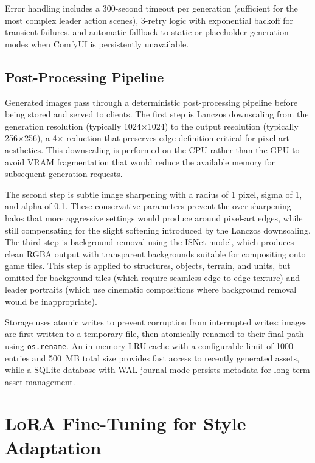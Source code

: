 \documentclass[conference]{IEEEtran}
\begin{document}
Error handling includes a 300-second timeout per generation (sufficient for the most complex leader action scenes), 3-retry logic with exponential backoff for transient failures, and automatic fallback to static or placeholder generation modes when ComfyUI is persistently unavailable.

\subsection{Post-Processing Pipeline}

Generated images pass through a deterministic post-processing pipeline before being stored and served to clients. The first step is Lanczos downscaling from the generation resolution (typically 1024$\times$1024) to the output resolution (typically 256$\times$256), a 4$\times$ reduction that preserves edge definition critical for pixel-art aesthetics. This downscaling is performed on the CPU rather than the GPU to avoid VRAM fragmentation that would reduce the available memory for subsequent generation requests.

The second step is subtle image sharpening with a radius of 1 pixel, sigma of 1, and alpha of 0.1. These conservative parameters prevent the over-sharpening halos that more aggressive settings would produce around pixel-art edges, while still compensating for the slight softening introduced by the Lanczos downscaling. The third step is background removal using the ISNet model, which produces clean RGBA output with transparent backgrounds suitable for compositing onto game tiles. This step is applied to structures, objects, terrain, and units, but omitted for background tiles (which require seamless edge-to-edge texture) and leader portraits (which use cinematic compositions where background removal would be inappropriate).

Storage uses atomic writes to prevent corruption from interrupted writes: images are first written to a temporary file, then atomically renamed to their final path using \texttt{os.rename}. An in-memory LRU cache with a configurable limit of 1000 entries and 500~MB total size provides fast access to recently generated assets, while a SQLite database with WAL journal mode persists metadata for long-term asset management.

\section{LoRA Fine-Tuning for Style Adaptation}
\label{sec:lora}
\end{document}
